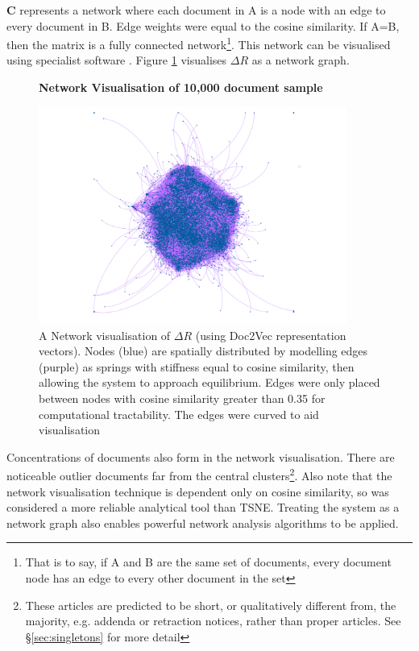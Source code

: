 $\mathbf{C}$ represents a network where each document in A is a node with an edge to every document in B. Edge weights were equal to the cosine similarity. If A=B, then the matrix is a fully connected network\footnote{That is to say, if A and B are the same set of documents, every document node has an edge to every other document in the set}. This network can be visualised using specialist software \cite{gephi}. Figure \ref{fig:gephi_exp} visualises $\Delta R$ as a network graph.
\begin{center}
\begin{figure}[H]
  \centering
  \textbf{Network Visualisation of 10,000 document sample}\par\medskip
     \includegraphics[width=0.9\textwidth]{Validation/sample.png}
    \caption[Network Visualisation of 10,000 document random sample]{A Network visualisation of $\Delta R$ (using Doc2Vec representation vectors). Nodes (blue) are spatially distributed by modelling edges (purple) as springs  with stiffness equal to cosine similarity, then allowing the system to approach equilibrium. Edges were only placed between nodes with cosine similarity greater than 0.35 for computational tractability. The edges were curved to aid visualisation}
    \label{fig:gephi_exp}
\end{figure} 
\end{center}
Concentrations of documents also form in the network visualisation. There are noticeable outlier documents far from the central clusters\footnote{These articles are predicted to be short, or qualitatively different from, the majority, e.g. addenda or retraction notices, rather than proper articles. See \S\ref{sec:singletons} for more detail}. Also note that the network visualisation technique is dependent only on cosine similarity, so was considered a more reliable analytical tool than TSNE. Treating the system as a network graph also enables powerful network analysis algorithms to be applied.